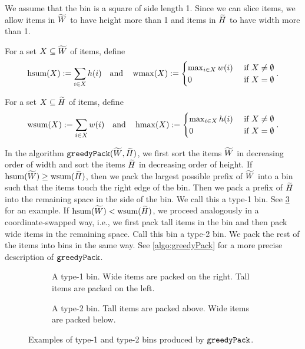 We assume that the bin is a square of side length 1. Since we can slice items,
we allow items in $\widetilde{W}$ to have height more than 1
and items in $\widetilde{H}$ to have width more than 1.

For a set $X \subseteq \widetilde{W}$ of items, define
\[ \operatorname{hsum}(X) := \sum_{i \in X} h(i) \quad\textrm{and}\quad
\operatorname{wmax}(X) := \begin{cases}\max_{i \in X} w(i) & \textrm{ if } X \neq \emptyset
\\ 0 & \textrm{ if } X = \emptyset\end{cases}. \]

For a set $X \subseteq \widetilde{H}$ of items, define
\[ \operatorname{wsum}(X) := \sum_{i \in X} w(i) \quad\textrm{and}\quad
\operatorname{hmax}(X) := \begin{cases}\max_{i \in X} h(i) & \textrm{ if } X \neq \emptyset
\\ 0 & \textrm{ if } X = \emptyset\end{cases}. \]

In the algorithm $\operatorname{\mathtt{greedyPack}}(\widetilde{W}, \widetilde{H})$, we first sort the items $\widetilde{W}$ in decreasing order
of width and sort the items $\widetilde{H}$ in decreasing order of height.
If $\operatorname{hsum}(\widetilde{W}) \ge \operatorname{wsum}(\widetilde{H})$, then we pack the largest possible prefix of $\widetilde{W}$
into a bin such that the items touch the right edge of the bin.
Then we pack a prefix of $\widetilde{H}$ into the remaining space in the side of the bin.
We call this a type-1 bin. See \cref{fig:greedy-pack} for an example.
If $\operatorname{hsum}(\widetilde{W}) < \operatorname{wsum}(\widetilde{H})$, we proceed analogously in a coordinate-swapped way,
i.e., we first pack tall items in the bin and then pack wide items in the remaining space.
Call this bin a type-2 bin.
We pack the rest of the items into bins in the same way.
See \cref{algo:greedyPack} for a more precise description of $\operatorname{\mathtt{greedyPack}}$.

\begin{figure}[!ht]
\begin{subfigure}{0.45\textwidth}
    \centering
    
    \caption{A type-1 bin. Wide items are packed on the right. Tall items are packed on the left.}%
\label{fig:greedy-pack:1}
\end{subfigure}
\hfil
\begin{subfigure}{0.45\textwidth}
    \centering
    
    \caption{A type-2 bin. Tall items are packed above. Wide items are packed below.}%
\label{fig:greedy-pack:2}
\end{subfigure}
\caption{Examples of type-1 and type-2 bins produced by $\operatorname{\mathtt{greedyPack}}$.}
\label{fig:greedy-pack}
\end{figure}

